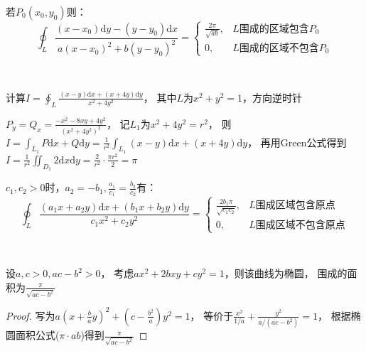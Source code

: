 \begin{corollary}[常用函数1]
  若$P_0(x_0,y_0)$则：
  \begin{equation*}
    \oint_L \frac{(x - x_0)\mathrm{d} y - (y - y_0)\mathrm{d} x}{a(x - x_0)^2 + b(y - y_0)^2} =
    \begin{cases}
      \frac{2\pi}{\sqrt{ab}}, &L\text{围成的区域包含}P_0\\
      0, & L\text{围成的区域不包含}P_0
    \end{cases}
  \end{equation*}
\end{corollary}

~

\begin{exercise}[推广题1]
  计算$I = \oint _L \frac{(x-y)\mathrm{d} x + (x + 4y)\mathrm{d} y}{x^2 + 4y^2}$，
  其中$L$为$x^2 + y^2 = 1$，方向逆时针
\end{exercise}

\begin{solution}
  $P_y = Q_x = \frac{-x^2 - 8xy + 4y^2}{(x^2 + 4y^2)^2}$，
  记$L_1$为$x^2 + 4y^2 = r^2$，
  则$I = \int_{L_1}P\mathrm{d} x + Q\mathrm{d} y = \frac{1}{r^2} \int_{L_1}(x - y)\mathrm{d} x + (x + 4y)\mathrm{d} y$，
  再用Green公式得到$I = \frac{1}{r^2} \iint_{D_1} 2 \mathrm{d} x \mathrm{d} y = \frac{2}{r^2} \cdot \frac{\pi r^2}{2} = \pi$
\end{solution}

\begin{corollary}[常用函数2]
  $c_1,c_2 > 0$时，$a_2 = -b_1, \frac{a_1}{c_1} = \frac{b_2}{c_2}$有：
  \begin{equation*}
    \oint_L \frac{(a_1x + a_2y)\mathrm{d}x + (b_1 x + b_2y)\mathrm{d} y}{c_1x^2 + c_2y^2} =
    \begin{cases}
      \frac{2b_1\pi}{\sqrt{c_1c_2}}, & L\text{围成区域包含原点}\\
      0, & L\text{围成区域不包含原点}
    \end{cases}
  \end{equation*}
\end{corollary}

~

\begin{lemma}[推广椭圆面积]
  设$a,c > 0, ac - b^2 > 0$，
  考虑$ax^2 + 2bxy + cy^2 = 1$，则该曲线为椭圆，
  围成的面积为$\frac{\pi}{\sqrt{ac - b^2}}$
\end{lemma}

\begin{proof}
  写为$a(x + \frac{b}{a}y)^2 + (c - \frac{b^2}{a})y^2 = 1$，
  等价于$\frac{x^2}{1/a} + \frac{y^2}{a/(ac - b^2)} = 1$，
  根据椭圆面积公式($\pi \cdot ab$)得到$\frac{\pi}{\sqrt{ac - b^2}}$
\end{proof}

